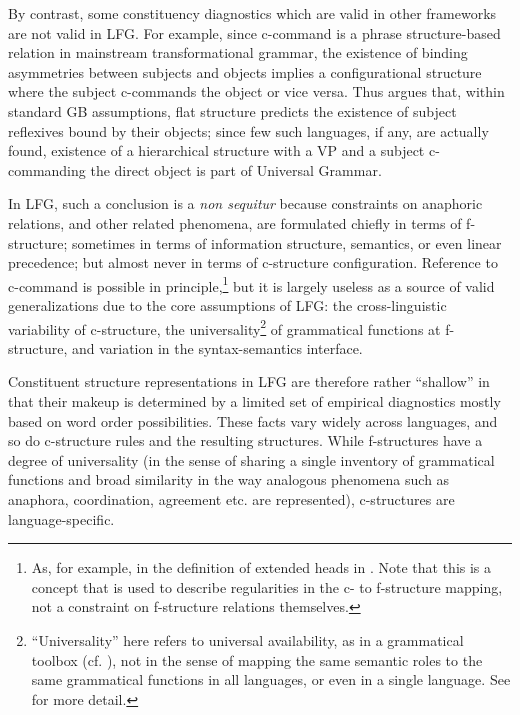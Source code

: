 \documentclass[output=paper]{langscibook}
\begin{document}
 By contrast, some constituency diagnostics which are valid in other frameworks are not valid in LFG. For example, since c-command is a phrase structure-based relation in mainstream transformational grammar, the existence of binding asymmetries between subjects and objects implies a configurational structure where the subject c-commands the object or vice versa. Thus \textcite[137]{speas1990} argues that, within standard GB assumptions, flat structure predicts the existence of subject reflexives bound by their objects; since few such languages, if any, are actually found, existence of a hierarchical structure with a VP and a subject c-commanding the direct object is part of Universal Grammar.
 
 In LFG, such a conclusion is a \textit{non sequitur} because constraints on anaphoric relations, and other related phenomena, are formulated chiefly in terms of f-structure; sometimes in terms of information structure, semantics, or even linear precedence; but almost never in terms of c-structure configuration. Reference to c-command is possible in principle,\footnote{As, for example, in the definition of extended heads in \textcite[136]{BresnanEtAl2016}. Note that this is a concept that is used to describe regularities in the c- to f-structure mapping, not a constraint on f-structure relations themselves.} but it is largely useless as a source of valid generalizations due to the core assumptions of LFG: the cross-linguistic variability of c-structure, the universality\footnote{``Universality'' here refers to universal availability, as in a grammatical toolbox (cf. \cite{jackendoff2002foundations}), not in the sense of mapping the same semantic roles to the same grammatical functions in all languages, or even in a single language. See  for more detail.} of grammatical functions at f-structure, and variation in the syntax-semantics interface.
 
 Constituent structure representations in LFG are therefore rather ``shallow'' in that their makeup is determined by a limited set of empirical diagnostics mostly based on word order possibilities. These facts vary widely across languages, and so do c-structure rules and the resulting structures. While f-structures have a degree of universality (in the sense of sharing a single inventory of grammatical functions and broad similarity in the way analogous phenomena such as anaph\-o\-ra, coordination, agreement etc. are represented), c-structures are lan\-guage-specific.
 
\end{document}
